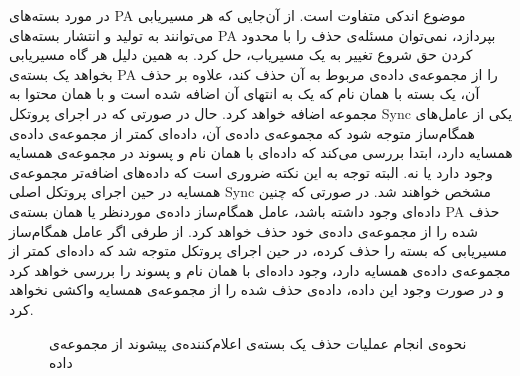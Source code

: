 در مورد بسته‌های PA موضوع اندکی متفاوت است. از آن‌جایی که هر مسیریابی می‌توانند به تولید و انتشار بسته‌های PA بپردازد، نمی‌توان مسئله‌ی حذف را با محدود کردن حق شروع تغییر به یک مسیریاب، حل کرد. به همین دلیل هر گاه مسیریابی بخواهد یک بسته‌ی PA را از مجموعه‌ی داده‌ی مربوط به آن حذف کند، علاوه بر حذف آن، یک بسته با همان نام که یک  به انتهای آن اضافه شده است و با همان محتوا به مجموعه اضافه خواهد کرد. حال در صورتی که در اجرای پروتکل Sync یکی از عامل‌های همگام‌ساز متوجه شود که مجموعه‌ی داده‌ی آن، داده‌ای کمتر از مجموعه‌ی داده‌ی همسایه دارد، ابتدا بررسی می‌کند که داده‌ای با همان نام و پسوند  در مجموعه‌ی همسایه وجود دارد یا نه. البته توجه به این نکته ضروری است که داده‌های اضافه‌تر مجموعه‌ی همسایه در حین اجرای پروتکل اصلی Sync مشخص خواهند شد. در صورتی که چنین داده‌ای وجود داشته باشد، عامل همگام‌ساز داده‌ی موردنظر یا همان بسته‌ی PA حذف شده را از مجموعه‌ی داده‌ی خود حذف خواهد کرد. از طرفی اگر عامل همگام‌ساز مسیریابی که بسته را حذف کرده، در حین اجرای پروتکل متوجه شد که داده‌ای کمتر از مجموعه‌ی داده‌ی همسایه دارد، وجود داده‌ای با همان نام و پسوند  را بررسی خواهد کرد و در صورت وجود این داده، داده‌ی حذف شده را از مجموعه‌ی همسایه واکشی نخواهد کرد.

\begin{figure}[h!]
\centering
%
\caption{نحوه‌ی انجام عملیات حذف یک بسته‌ی اعلام‌کننده‌ی پیشوند از مجموعه‌ی داده}
\label{fig:Sync2}
\end{figure}


